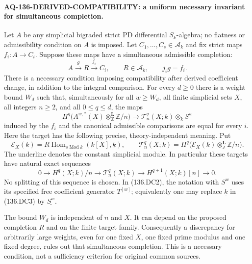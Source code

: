 \paragraph{AQ-136-DERIVED-COMPATIBILITY: a uniform necessary invariant for simultaneous completion.}
Let $A$ be any simplicial bigraded strict PD differential
$S_k$-algebra; no flatness or admissibility condition on $A$
is imposed.  Let $C_1,\ldots,C_s\in\mathcal A_k$ and fix
strict maps $f_i:A\to C_i$.  Suppose these maps have a
simultaneous admissible completion:
\[
 A\xrightarrow{g}R\xrightarrow{j_i}C_i,
       \qquad R\in\mathcal A_k,\qquad j_i g=f_i.
                                                               \tag{136.DC1}
\]
There is a necessary condition imposing compatibility
after derived coefficient change, in addition to the
integral comparison.
For every $d\ge0$ there is a weight bound $W_d$ such that,
simultaneously for all $w\ge W_d$, all finite simplicial
sets $X$, all integers $n\ge2$, and all $0\le q\le d$,
the maps
\[
 H^q\bigl(A^{w,*}(X)\otimes^{\mathbf L}_{\mathbb Z}
                         \mathbb Z/n\bigr)
 \longrightarrow \mathcal T^q_n(X;k)\otimes_k S^w
                                                               \tag{136.DC2}
\]
induced by the $f_i$ and the canonical admissible comparisons
are equal for every $i$.  Here the target has the following
precise, theory-independent meaning.  Put
\[
 \mathcal E_X(k)=R\operatorname{Hom}_{s\operatorname{Mod}k}
                         (k[X],\underline{k}),\qquad
 \mathcal T^q_n(X;k)=H^q\bigl(\mathcal E_X(k)
                  \otimes^{\mathbf L}_{\mathbb Z}\mathbb Z/n\bigr).
                                                               \tag{136.DC3}
\]
The underline denotes the constant simplicial module.  In
particular these targets have natural exact sequences
\[
 0\longrightarrow H^q(X;k)/n
 \longrightarrow\mathcal T^q_n(X;k)
 \longrightarrow H^{q+1}(X;k)[n]\longrightarrow0.
                                                               \tag{136.DC4}
\]
No splitting of this sequence is chosen.  In (136.DC2), the
notation with $S^w$ uses its specified free coefficient
generator $T^{[w]}$; equivalently one may replace
$\underline{k}$ in (136.DC3) by $\underline{S^w}$.

The bound $W_d$ is independent of $n$ and $X$.
It can depend on the proposed completion $R$ and on the
finite target family.  Consequently a discrepancy for
arbitrarily large weights, even for one fixed $X$, one
fixed prime modulus and one fixed degree, rules out that
simultaneous completion.  This is a necessary condition,
not a sufficiency criterion for original common sources.

